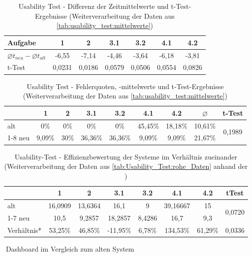 \begin{table}[H]
    \centering
    \begin{tabular}{|l|c|c|c|c|c|c|}
    \hline
    Aufgabe                                     & 1     & 2     & 3.1   & 3.2     & 4.1   & 4.2 \\ \hline
    $\varnothing t_{neu} - \varnothing t_{alt}$ & -6,55 & -7,14 & -4,46 & -3,64 & -6,18 & -3,81 \\ \hline
    t-Test                                      & 0,0231& 0,0186& 0,0579& 0,0506& 0,0554& 0,0826\\ \hline
    \end{tabular}
    
    \caption{Usability Test - Differenz der Zeitmittelwerte und t-Test-Ergebnisse (Weiterverarbeitung der Daten aus \autoref{tab:usability_test:mittelwerte})}
    \label{tab:usability_test:Differenz+ttest_Zeit}
\end{table}

\begin{table}[H]
    \centering
    \begin{tabular}{|l|c|c|c|c|c|c|c|c|}
    \hline
     & 1      & 2    & 3.1     & 3.2     & 4.1     & 4.2     & $\varnothing$ & t-Test                  \\ \hline
    alt     & 0\%    & 0\%  & 0\%     & 0\%     & 45,45\% & 18,18\% & 10,61\% & \multirow{2}{*}{0,1989} \\ \cline{1-8}
    neu     & 9,09\% & 30\% & 36,36\% & 36,36\% & 9,09\%  & 9,09\%  & 21,67\% &                         \\ \hline
    \end{tabular}
    \caption{Usability Test - Fehlerquoten, -mittelwerte und t-Test-Ergebnisse (Weiterverarbeitung der Daten aus \autoref{tab:usability_test:mittelwerte})}
    \label{tab:usability_test:Differenz+ttest_Fehler}
\end{table}  %

\begin{table}[H]
    \centering
    \begin{tabular}{|l|c|c|c|c|c|c|c|}
        \hline
            & 1 & 2 & 3.1 & 3.2 & 4.1 & 4.2 & tTest \\ \hline
        alt	& 16,0909 & 13,6364 & 16,1 & 9 & 39,16667 & 15 & \multirow{2}{*}{0,0720} \\ \cline{1-7}
        neu	& 10,5 & 9,2857 & 18,2857 & 8,4286 & 16,7 & 9,3	& \\ \hline
        Verhältnis* & 53,25\% & 46,85\% & -11,95\% & 6,78\% & 134,53\% & 61,29\% & 0,0336 \\ \hline
    \end{tabular}
    \caption[Usability-Test - Effizienzbewertung der Systeme im Verhältnis zueinander (Weiterverarbeitung der Daten aus \autoref{tab:Usability_Test:rohe_Daten})]{Usability-Test - Effizienzbewertung der Systeme im Verhältnis zueinander (Weiterverarbeitung der Daten aus \autoref{tab:Usability_Test:rohe_Daten} anhand der )}
    \textcolor{white}{.}\hfill *Dashboard im Vergleich zum alten System
    \label{tab:usability_test:effizienz}
\end{table}
